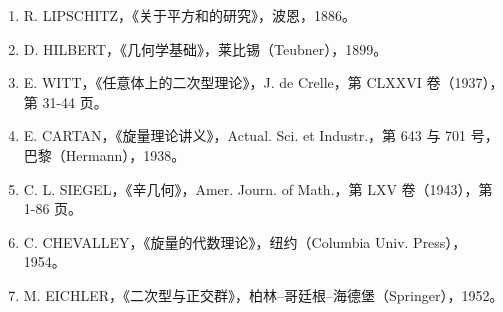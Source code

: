\begin{enumerate}
  W. K. CLIFFORD，《数学论文集》，伦敦（Macmillan），1882：a) 《论几何代数的分类》，第 397-401 页；b) 《格拉斯曼广延代数的应用》，第 266-276 页（= Amer. Journ. of Math.，第 I 卷（1878））。
\item
  R. LIPSCHITZ，《关于平方和的研究》，波恩，1886。
\item
  D. HILBERT，《几何学基础》，莱比锡（Teubner），1899。
\item
  E. WITT，《任意体上的二次型理论》，J. de Crelle，第 CLXXVI 卷（1937），第 31-44 页。
\item
  E. CARTAN，《旋量理论讲义》，Actual. Sci. et Industr.，第 643 与 701 号，巴黎（Hermann），1938。
\item
  C. L. SIEGEL，《辛几何》，Amer. Journ. of Math.，第 LXV 卷（1943），第 1-86 页。
\item
  C. CHEVALLEY，《旋量的代数理论》，纽约（Columbia Univ. Press），1954。
\item
  M. EICHLER，《二次型与正交群》，柏林–哥廷根–海德堡（Springer），1952。
\end{enumerate}

